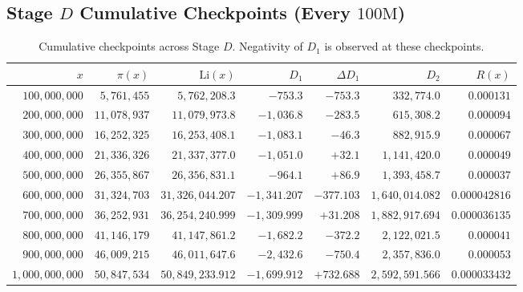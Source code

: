 \documentclass[12pt,a4paper]{article}
\begin{document}
\subsection{Stage $D$ Cumulative Checkpoints (Every $100\text{M}$)}
\begin{table}[H]
\centering\small
\begin{tabular}{rrrrrrr}
\toprule
$x$ & $\pi(x)$ & $\mathrm{Li}(x)$ & $D_1$ & $\Delta D_1$ & $D_2$ & $R(x)$ \\
\midrule
$100{,}000{,}000$ & $5{,}761{,}455$ & $5{,}762{,}208.3$ & $-753.3$ & $-753.3$ & $332{,}774.0$ & $0.000131$ \\
$200{,}000{,}000$ & $11{,}078{,}937$ & $11{,}079{,}973.8$ & $-1{,}036.8$ & $-283.5$ & $615{,}308.2$ & $0.000094$ \\
$300{,}000{,}000$ & $16{,}252{,}325$ & $16{,}253{,}408.1$ & $-1{,}083.1$ & $-46.3$ & $882{,}915.9$ & $0.000067$ \\
$400{,}000{,}000$ & $21{,}336{,}326$ & $21{,}337{,}377.0$ & $-1{,}051.0$ & $+32.1$ & $1{,}141{,}420.0$ & $0.000049$ \\
$500{,}000{,}000$ & $26{,}355{,}867$ & $26{,}356{,}831.1$ & $-964.1$ & $+86.9$ & $1{,}393{,}458.7$ & $0.000037$ \\
$600{,}000{,}000$ & $31{,}324{,}703$ & $31{,}326{,}044.207$ & $-1{,}341.207$ & $-377.103$ & $1{,}640{,}014.082$ & $0.000042816$ \\
$700{,}000{,}000$ & $36{,}252{,}931$ & $36{,}254{,}240.999$ & $-1{,}309.999$ & $+31.208$ & $1{,}882{,}917.694$ & $0.000036135$ \\
$800{,}000{,}000$ & $41{,}146{,}179$ & $41{,}147{,}861.2$ & $-1{,}682.2$ & $-372.2$ & $2{,}122{,}021.5$ & $0.000041$ \\
$900{,}000{,}000$ & $46{,}009{,}215$ & $46{,}011{,}647.6$ & $-2{,}432.6$ & $-750.4$ & $2{,}357{,}836.0$ & $0.000053$ \\
$1{,}000{,}000{,}000$ & $50{,}847{,}534$ & $50{,}849{,}233.912$ & $-1{,}699.912$ & $+732.688$ & $2{,}592{,}591.566$ & $0.000033432$ \\
\bottomrule
\end{tabular}
\caption{Cumulative checkpoints across Stage $D$. Negativity of $D_1$ is observed at these checkpoints.}
\end{table}
\end{document}
